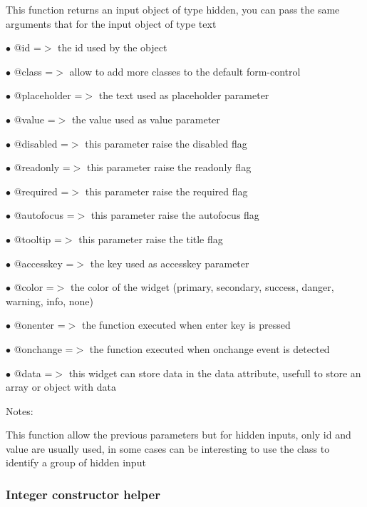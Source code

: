 \documentclass[a4paper]{article}
\begin{document}
This function returns an input object of type hidden, you can pass the same arguments
that for the input object of type text

\begin{compactitem}
\item[\color{myblue}$\bullet$] @id          =$>$ the id used by the object
\item[\color{myblue}$\bullet$] @class       =$>$ allow to add more classes to the default form-control
\item[\color{myblue}$\bullet$] @placeholder =$>$ the text used as placeholder parameter
\item[\color{myblue}$\bullet$] @value       =$>$ the value used as value parameter
\item[\color{myblue}$\bullet$] @disabled    =$>$ this parameter raise the disabled flag
\item[\color{myblue}$\bullet$] @readonly    =$>$ this parameter raise the readonly flag
\item[\color{myblue}$\bullet$] @required    =$>$ this parameter raise the required flag
\item[\color{myblue}$\bullet$] @autofocus   =$>$ this parameter raise the autofocus flag
\item[\color{myblue}$\bullet$] @tooltip     =$>$ this parameter raise the title flag
\item[\color{myblue}$\bullet$] @accesskey   =$>$ the key used as accesskey parameter
\item[\color{myblue}$\bullet$] @color       =$>$ the color of the widget (primary, secondary, success, danger, warning,
                info, none)
\item[\color{myblue}$\bullet$] @onenter     =$>$ the function executed when enter key is pressed
\item[\color{myblue}$\bullet$] @onchange    =$>$ the function executed when onchange event is detected
\item[\color{myblue}$\bullet$] @data        =$>$ this widget can store data in the data attribute, usefull to store
                an array or object with data
\end{compactitem}

Notes:

This function allow the previous parameters but for hidden inputs, only id
and value are usually used, in some cases can be interesting to use the
class to identify a group of hidden input

\hypertarget{toc52}{}
\subsubsection{Integer constructor helper}
\end{document}
